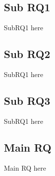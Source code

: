 \subsection{Sub RQ1}
SubRQ1 here

\subsection{Sub RQ2}
SubRQ1 here

\subsection{Sub RQ3}
SubRQ1 here

\subsection{Main RQ}
Main RQ here
